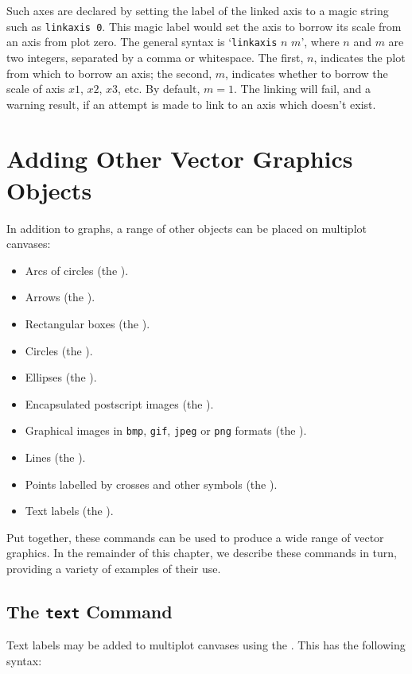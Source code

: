 Such axes are declared by setting the label of the linked axis to a magic
string such as {\tt linkaxis 0}\label{sec:linked_axes}. This magic label would set the axis to borrow
its scale from an axis from plot zero. The general syntax is `{\tt linkaxis}
$n$ $m$', where $n$ and $m$ are two integers, separated by a comma or
whitespace. The first, $n$, indicates the plot from which to borrow an axis;
the second, $m$, indicates whether to borrow the scale of axis $x1$, $x2$,
$x3$, etc. By default, $m=1$. The linking will fail, and a warning result, if
an attempt is made to link to an axis which doesn't exist.

\section{Adding Other Vector Graphics Objects}

In addition to graphs, a range of other objects can be placed on multiplot
canvases:
\begin{itemize}
\item Arcs of circles (the ).
\item Arrows (the ).
\item Rectangular boxes (the ).
\item Circles (the ).
\item Ellipses (the ).
\item Encapsulated postscript images (the ).
\item Graphical images in {\tt bmp}, {\tt gif}, {\tt jpeg} or {\tt png} formats (the ).
\item Lines (the ).
\item Points labelled by crosses and other symbols (the ).
\item Text labels (the ).
\end{itemize}
Put together, these commands can be used to produce a wide range of vector
graphics. In the remainder of this chapter, we describe these commands in turn,
providing a variety of examples of their use.

\subsection{The {\tt text} Command}

Text labels may be added to multiplot canvases using the . This
has the following syntax:

